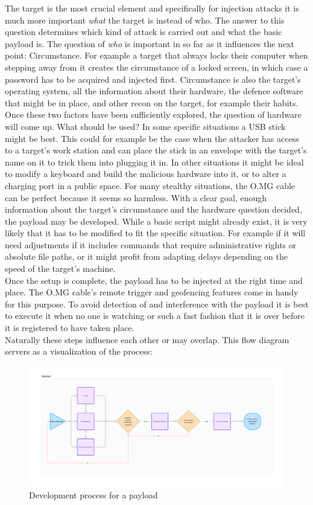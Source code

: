 The target is the most crucial element and specifically for injection attacks it is much more important \emph{what} the target is instead of who. The answer to this question determines which kind of attack is carried out and what the basic payload is. The question of \emph{who} is important in so far as it influences the next point: Circumstance. For example a target that always locks their computer when stepping away from it creates the circumstance of a locked screen, in which case a password has to be acquired and injected first. Circumstance is also the target's operating system, all the information about their hardware, the defence software that might be in place, and other recon on the target, for example their habits. Once these two factors have been sufficiently explored, the question of hardware will come up. What should be used? In some specific situations a USB stick might be best. This could for example be the case when the attacker has access to a target's work station and can place the stick in an envelope with the target's name on it to trick them into plugging it in. In other situations it might be ideal to modify a keyboard and build the malicious hardware into it, or to alter a charging port in a public space. For many stealthy situations, the O.MG cable can be perfect because it seems so harmless. With a clear goal, enough information about the target's circumstance and the hardware question decided, the payload may be developed. While a basic script might already exist, it is very likely that it has to be modified to fit the specific situation. For example if it will need adjustments if it includes commands that require administrative rights or absolute file paths, or it might profit from adapting delays depending on the speed of the target's machine. \\
Once the setup is complete, the payload has to be injected at the right time and place. The O.MG cable's remote trigger and geofencing features come in handy for this purpose. To avoid detection of and interference with the payload it is best to execute it when no one is watching or such a fast fashion that it is over before it is registered to have taken place.\\
Naturally these steps influence each other or may overlap. This flow diagram servers as a visualization of the process:


\begin{figure}[H]
    \centering
    \includegraphics[width=1\linewidth]{visuals/attack_dev.png}
    \caption{Development process for a payload}
\end{figure}


